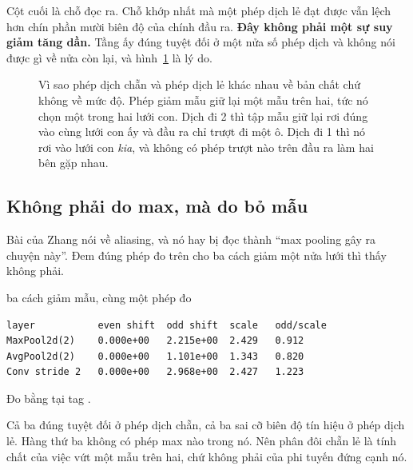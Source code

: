 Cột cuối là chỗ đọc ra. Chỗ khớp nhất mà một phép dịch lẻ đạt được vẫn lệch hơn
chín phần mười biên độ của chính đầu ra. \textbf{Đây không phải một sự suy giảm
tăng dần.} Tầng ấy đúng tuyệt đối ở một nửa số phép dịch và không nói được gì
về nửa còn lại, và hình~\ref{fig:ch10-chan-le} là lý do.

\begin{figure}[htbp]
  \centering
  
  \caption{Vì sao phép dịch chẵn và phép dịch lẻ khác nhau về bản chất chứ
  không về mức độ. Phép giảm mẫu giữ lại một mẫu trên hai, tức nó chọn một
  trong hai lưới con. Dịch đi 2 thì tập mẫu giữ lại rơi đúng vào cùng lưới con
  ấy và đầu ra chỉ trượt đi một ô. Dịch đi 1 thì nó rơi vào lưới con \emph{kia},
  và không có phép trượt nào trên đầu ra làm hai bên gặp nhau.}
  \label{fig:ch10-chan-le}
\end{figure}

\subsection*{Không phải do max, mà do bỏ mẫu}

%
Bài của Zhang nói về aliasing, và nó hay bị đọc thành \enquote{max pooling gây
ra chuyện này}. Đem đúng phép đo trên cho ba cách giảm một nửa lưới thì thấy
không phải.

\begin{measured}{ba cách giảm mẫu, cùng một phép đo}
\begin{verbatim}
layer           even shift  odd shift  scale   odd/scale
MaxPool2d(2)    0.000e+00   2.215e+00  2.429   0.912
AvgPool2d(2)    0.000e+00   1.101e+00  1.343   0.820
Conv stride 2   0.000e+00   2.968e+00  2.427   1.223
\end{verbatim}

Đo bằng  tại tag .
\end{measured}

Cả ba đúng tuyệt đối ở phép dịch chẵn, cả ba sai cỡ biên độ tín hiệu ở phép
dịch lẻ. Hàng thứ ba không có phép max nào trong nó. Nên phân đôi chẵn lẻ là
tính chất của việc vứt một mẫu trên hai, chứ không phải của phi tuyến đứng cạnh
nó.

